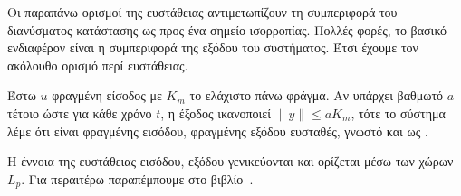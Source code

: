 Οι παραπάνω ορισμοί της ευστάθειας αντιμετωπίζουν τη συμπεριφορά του διανύσματος
κατάστασης ως προς ένα σημείο ισορροπίας. Πολλές φορές, το βασικό ενδιαφέρον
είναι η συμπεριφορά της εξόδου του συστήματος. Έτσι έχουμε τον ακόλουθο ορισμό
περί ευστάθειας.

\begin{definition} 
    Έστω \( u \) φραγμένη είσοδος με \( K_m \) το ελάχιστο πάνω φράγμα. Αν
    υπάρχει βαθμωτό \( a \) τέτοιο ώστε για κάθε χρόνο \( t \), η έξοδος
    ικανοποιεί \( \|y\| \leq aK_m \), τότε το σύστημα λέμε ότι είναι φραγμένης
    εισόδου, φραγμένης εξόδου ευσταθές, γνωστό και ως .
\end{definition}

Η έννοια της ευστάθειας εισόδου, εξόδου γενικεύονται και ορίζεται μέσω των χώρων
\( L_p \). Για περαιτέρω παραπέμπουμε στο βιβλίο~\cite{vidyasagar2002nonlinear}.

